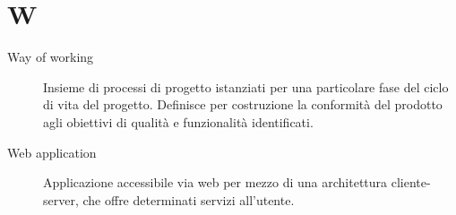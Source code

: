\documentclass{article}
\begin{document}
\section{W}
\begin{description}
  \item[Way of working] Insieme di processi di progetto istanziati per una particolare fase del ciclo di vita del progetto. Definisce per costruzione la conformità del prodotto agli obiettivi di qualità e funzionalità identificati.
  \item[Web application] Applicazione accessibile via web per mezzo di una architettura cliente-server, che offre determinati servizi all'utente.
\end{description}
\newpage
\end{document}

